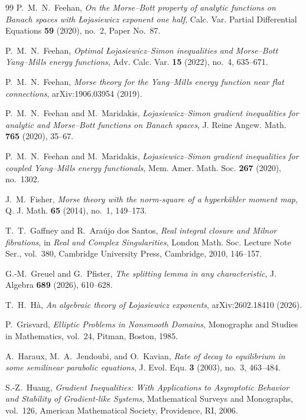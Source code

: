 \documentclass[11pt]{article}
\theoremstyle{definition}
\theoremstyle{remark}
\begin{document}
\begin{thebibliography}{99}
P.~M.~N.~Feehan,
\emph{On the Morse--Bott property of analytic functions on Banach spaces with \L{}ojasiewicz exponent one half},
Calc. Var. Partial Differential Equations \textbf{59} (2020), no.~2, Paper No.~87.

P.~M.~N.~Feehan,
\emph{Optimal \L{}ojasiewicz--Simon inequalities and Morse--Bott Yang--Mills energy functions},
Adv. Calc. Var. \textbf{15} (2022), no.~4, 635--671.

P.~M.~N.~Feehan,
\emph{Morse theory for the Yang--Mills energy function near flat connections},
arXiv:1906.03954 (2019).

P.~M.~N.~Feehan and M.~Maridakis,
\emph{\L{}ojasiewicz--Simon gradient inequalities for analytic and Morse--Bott functions on Banach spaces},
J. Reine Angew. Math. \textbf{765} (2020), 35--67.

P.~M.~N.~Feehan and M.~Maridakis,
\emph{\L{}ojasiewicz--Simon gradient inequalities for coupled Yang--Mills energy functionals},
Mem. Amer. Math. Soc. \textbf{267} (2020), no.~1302.

J.~M.~Fisher,
\emph{Morse theory with the norm-square of a hyperk\"ahler moment map},
Q. J. Math. \textbf{65} (2014), no.~1, 149--173.

T.~T.~Gaffney and R.~Ara\'ujo dos Santos,
\emph{Real integral closure and Milnor fibrations},
in \emph{Real and Complex Singularities}, London Math. Soc. Lecture Note Ser., vol.~380,
Cambridge University Press, Cambridge, 2010, 146--157.

G.-M.~Greuel and G.~Pfister,
\emph{The splitting lemma in any characteristic},
J. Algebra \textbf{689} (2026), 610--628.

T.~H.~H\`a, 
\emph{An algebraic theory of \L{}ojasiewicz exponents},
arXiv:2602.18410 (2026).

P.~Grisvard,
\emph{Elliptic Problems in Nonsmooth Domains},
Monographs and Studies in Mathematics, vol.~24, Pitman, Boston, 1985.

A.~Haraux, M.~A.~Jendoubi, and O.~Kavian,
\emph{Rate of decay to equilibrium in some semilinear parabolic equations},
J. Evol. Equ. \textbf{3} (2003), no.~3, 463--484.

S.-Z.~Huang,
\emph{Gradient Inequalities: With Applications to Asymptotic Behavior and Stability of Gradient-like Systems},
Mathematical Surveys and Monographs, vol.~126, American Mathematical Society, Providence, RI, 2006.


\end{thebibliography}
\end{document}
